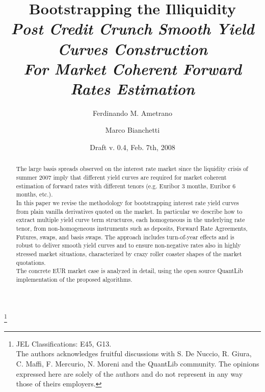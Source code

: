 \documentclass[11pt,reqno]{amsart}
\begin{document}
\title[Smooth Yield Curves For Euribor Estimation]{Bootstrapping the Illiquidity \\ \footnotesize{\emph{Post Credit Crunch Smooth Yield Curves Construction \\
For Market Coherent Forward Rates Estimation}}}

\author{Ferdinando M. Ametrano}
\address{Financial Engineering, Banca IMI, Piazzetta G. Dell'Amore 3, 20121
Milan Italy, ferdinando.ametrano(AT)bancaimi.com}

\author{Marco Bianchetti}
\address{Risk Management, Banca IntesaSanpaolo, Piazza G. Ferrari 10, 20121
Milan Italy, marco.bianchetti(AT)intesasanpaolo.com}

\thanks{JEL Classifications: E45, G13. \\ The authors acknowledges fruitful discussions with S. De Nuccio, R. Giura, C. Maffi, F. Mercurio, N. Moreni and the QuantLib community. The opinions expressed here are solely of the authors and do not represent in any way those of theirs employers.}

\date{Draft v. 0.4, Feb. 7th, 2008}


\begin{abstract}
The large basis spreads observed on the interest rate market since the liquidity crisis of summer 2007 imply that different yield curves are required for market coherent estimation of forward rates with different tenors (e.g. Euribor 3 months, Euribor 6 months, etc.).
\\ In this paper we revise the methodology for bootstrapping interest rate yield curves from plain vanilla derivatives quoted on the market.
In particular we describe how to extract multiple yield curve term structures, each homogeneous in the underlying rate tenor, from non-homogeneous instruments such as deposits, Forward Rate Agreements, Futures, swaps, and basis swaps. The approach includes turn-of-year effects and is robust to deliver smooth yield curves and to ensure non-negative rates also in highly stressed market situations, characterized by crazy roller coaster shapes of the market quotations.
\\ The concrete EUR market case is analyzed in detail, using the open source QuantLib implementation of the proposed algorithms.
\end{abstract}
\end{document}
